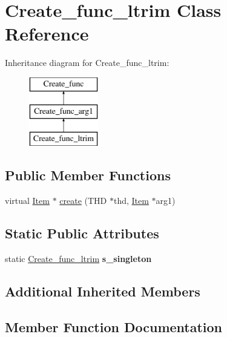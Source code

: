 \hypertarget{classCreate__func__ltrim}{}\section{Create\+\_\+func\+\_\+ltrim Class Reference}
\label{classCreate__func__ltrim}
Inheritance diagram for Create\+\_\+func\+\_\+ltrim\+:\begin{figure}[H]
\begin{center}
\leavevmode
\includegraphics[height=3.000000cm]{classCreate__func__ltrim}
\end{center}
\end{figure}
\subsection*{Public Member Functions}
\begin{DoxyCompactItemize}
\item 
virtual \mbox{\hyperlink{classItem}{Item}} $\ast$ \mbox{\hyperlink{classCreate__func__ltrim_af4c5aaff99fc093e1a6068f45d260ee4}{create}} (T\+HD $\ast$thd, \mbox{\hyperlink{classItem}{Item}} $\ast$arg1)
\end{DoxyCompactItemize}
\subsection*{Static Public Attributes}
\begin{DoxyCompactItemize}
\item 
\mbox{\label{classCreate__func__ltrim_a8cbdfd13d8e5cef3e0072d8f7eb0ab3b}} 
static \mbox{\hyperlink{classCreate__func__ltrim}{Create\+\_\+func\+\_\+ltrim}} {\bfseries s\+\_\+singleton}
\end{DoxyCompactItemize}
\subsection*{Additional Inherited Members}


\subsection{Member Function Documentation}
\mbox{\label{classCreate__func__ltrim_af4c5aaff99fc093e1a6068f45d260ee4}} 
